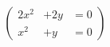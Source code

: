 \documentclass[a4paper,12pt]{exam}
\begin{document}
\[
\left(
\begin{array}{rcl}
2x^2 & +2y & =0\\
x^2 & +y & =0
\end{array}
\right)
\]
\end{document}
